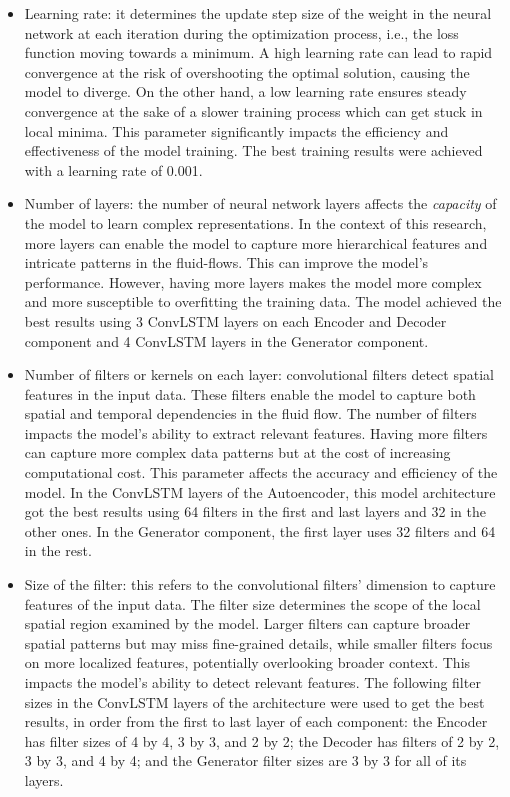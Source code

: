 \begin{itemize}
    \item Learning rate: it determines the update step size of the weight in the neural network at each iteration during the optimization process, i.e., the loss function moving towards a minimum. A high learning rate can lead to rapid convergence at the risk of overshooting the optimal solution, causing the model to diverge. On the other hand, a low learning rate ensures steady convergence at the sake of a slower training process which can get stuck in local minima. This parameter significantly impacts the efficiency and effectiveness of the model training. The best training results were achieved with a learning rate of 0.001.
    
    \item Number of layers: the number of neural network layers affects the \textit{capacity} of the model to learn complex representations. In the context of this research, more layers can enable the model to capture more hierarchical features and intricate patterns in the fluid-flows. This can improve the model's performance. However, having more layers makes the model more complex and more susceptible to overfitting the training data. The model achieved the best results using 3 ConvLSTM layers on each Encoder and Decoder component and 4 ConvLSTM layers in the Generator component.
    
    \item Number of filters or kernels on each layer: convolutional filters detect spatial features in the input data. These filters enable the model to capture both spatial and temporal dependencies in the fluid flow. The number of filters impacts the model's ability to extract relevant features. Having more filters can capture more complex data patterns but at the cost of increasing computational cost. This parameter affects the accuracy and efficiency of the model. In the ConvLSTM layers of the Autoencoder, this model architecture got the best results using 64 filters in the first and last layers and 32 in the other ones. In the Generator component, the first layer uses 32 filters and 64 in the rest.
    
    \item Size of the filter: this refers to the convolutional filters' dimension to capture features of the input data. The filter size determines the scope of the local spatial region examined by the model. Larger filters can capture broader spatial patterns but may miss fine-grained details, while smaller filters focus on more localized features, potentially overlooking broader context. This impacts the model's ability to detect relevant features. The following filter sizes in the ConvLSTM layers of the architecture were used to get the best results, in order from the first to last layer of each component: the Encoder has filter sizes of 4 by 4, 3 by 3, and 2 by 2; the Decoder has filters of 2 by 2, 3 by 3, and 4 by 4; and the Generator filter sizes are 3 by 3 for all of its layers. 
\end{itemize}

